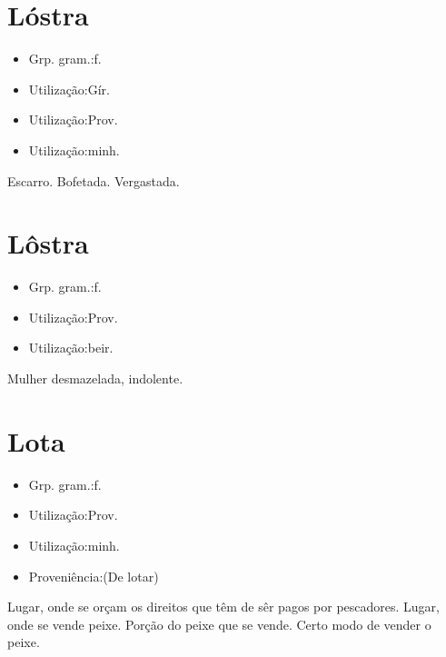 \section{Lóstra}
\begin{itemize}
\item {Grp. gram.:f.}
\end{itemize}
\begin{itemize}
\item {Utilização:Gír.}
\end{itemize}
\begin{itemize}
\item {Utilização:Prov.}
\end{itemize}
\begin{itemize}
\item {Utilização:minh.}
\end{itemize}
Escarro.
Bofetada.
Vergastada.
\section{Lôstra}
\begin{itemize}
\item {Grp. gram.:f.}
\end{itemize}
\begin{itemize}
\item {Utilização:Prov.}
\end{itemize}
\begin{itemize}
\item {Utilização:beir.}
\end{itemize}
Mulher desmazelada, indolente.
\section{Lota}
\begin{itemize}
\item {Grp. gram.:f.}
\end{itemize}
\begin{itemize}
\item {Utilização:Prov.}
\end{itemize}
\begin{itemize}
\item {Utilização:minh.}
\end{itemize}
\begin{itemize}
\item {Proveniência:(De \textunderscore lotar\textunderscore )}
\end{itemize}
Lugar, onde se orçam os direitos que têm de sêr pagos por pescadores.
Lugar, onde se vende peixe.
Porção do peixe que se vende.
Certo modo de vender o peixe.

